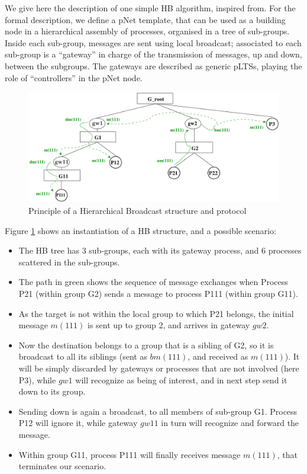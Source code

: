 \documentclass{lncs/llncs}
\begin{document}
We give here the description of one simple HB algorithm, inspired
from\cite{Taguchi03}. For the formal description, we define a
pNet template, that can be used as a building node in a hierarchical
assembly of processes, organised in a tree of sub-groups. Inside each
sub-group, messages are sent using  local broadcast; associated to
each sub-group is a ``gateway'' in charge of the
transmission of messages, up and down, between the subgroups. The
gateways are described as generic pLTSs, playing the role of
``controllers'' in the pNet node.

\begin{figure}[t]
\centerline{  \includegraphics[width=0.9\linewidth]{XFIG/SchemaHB2}}
  \caption{Principle of a Hierarchical Broadcast structure and protocol}
  \label{fig:hb-scenario}
\end{figure}

Figure \ref{fig:hb-scenario} shows an instantiation of a HB
structure, and a possible scenario:
\begin{itemize}
\item
  The HB tree has 3 sub-groups, each with its gateway process, and 6
  processes scattered in the sub-groups.
\item
  The path in green shows the sequence of message exchanges when Process P21 (within
  group G2) sends a message to process P111 (within group G11).
\item
  As the target is not within the local group to which P21 belongs,
  the initial message $m(111)$ is sent up to group 2, and
  arrives in gateway $gw2$.
\item
  Now the destination belongs to a group that is a sibling of G2, so
  it is broadcast to all its siblings (sent as $bm(111)$, and
  received as $m(111)$). It will be simply discarded by
  gateways or processes that are not involved (here P3), while $gw1$
  will recognize as being of interest, and in next step send it down
  to its group.
\item
  Sending down is again a broadcast, to all members of sub-group
  G1. Process P12 will ignore it, while gateway $gw11$ in turn
  will recognize and forward the message.
\item
  Within group G11, process P111 will finally receives message
  $m(111)$, that terminates our scenario.
\end{itemize}
\end{document}
